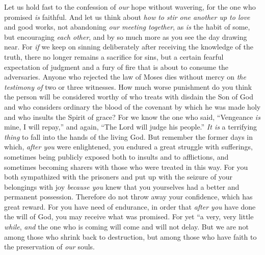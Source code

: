 \begin{biblechapter}
\verse Let us hold fast to the confession of \textit{our} hope without wavering, for the one who promised \textit{is} faithful.
\verse And let us think about \textit{how to stir one another up to love} and good works,
\verse not abandoning \textit{our meeting together}, as \textit{is} the habit of some, but encouraging \textit{each other}, and by so much more as you see the day drawing near.
 For \textit{if} we keep on sinning deliberately after receiving the knowledge of the truth, there no longer remains a sacrifice for sins,
\verse but a certain fearful expectation of judgment and a fury of fire that is about to consume the adversaries.
\verse Anyone who rejected the law of Moses dies without mercy on \textit{the testimony of} two or three witnesses.
\verse How much worse punishment do you think the person will be considered worthy of who treats with disdain the Son of God and who considers ordinary the blood of the covenant by which he was made holy and who insults the Spirit of grace?
\verse For we know the one who said, “Vengeance \textit{is} mine, I will repay,” and again, “The Lord will judge his people.”
\verse \textit{It is} a terrifying \textit{thing} to fall into the hands of the living God.
\verse But remember the former days in which, \textit{after you} were enlightened, you endured a great struggle with sufferings,
\verse sometimes being publicly exposed both to insults and to afflictions, and sometimes becoming sharers with those who were treated in this way.
\verse For you both sympathized with the prisoners and put up with the seizure of your belongings with joy \textit{because you} knew that you yourselves had a better and permanent possession.
\verse Therefore do not throw away your confidence, which has great reward.
\verse For you have need of endurance, in order that \textit{after you} have done the will of God, you may receive what was promised.
\verse For yet
\verse “a very, very little \textit{while}, 
\textit{and} the one who is coming will come and will not delay.
\verse But we are not among those who shrink back to destruction, but among those who have faith to the preservation of \textit{our} souls.
\end{biblechapter}

